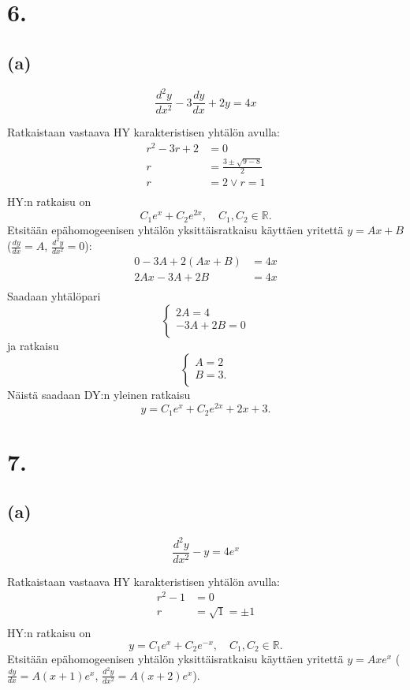 \documentclass{article}
\begin{document}
\section*{6.}

\subsection*{(a)}

\[
  \frac{d^2 y}{d x^2} - 3\frac{dy}{dx} + 2y = 4x
\]

Ratkaistaan vastaava HY karakteristisen yhtälön avulla:
\begin{align*}
  r^2 - 3r + 2 &= 0 \\
  r &= \frac{3 \pm \sqrt{9 - 8}}{2} \\
  r &= 2 \vee r = 1 \\
\end{align*}
HY:n ratkaisu on
\[
  C_1e^x + C_2e^{2x}, \quad C_1,C_2 \in \mathbb{R}.
\]
Etsitään epähomogeenisen yhtälön yksittäisratkaisu käyttäen yritettä
$y = Ax + B$ ($\frac{dy}{dx} = A$, $\frac{d^2 y}{d x^2} = 0$):
\begin{align*}
  0 - 3A + 2(Ax + B) &= 4x \\
  2Ax - 3A + 2B &= 4x \\
\end{align*}
Saadaan yhtälöpari
\[
  \begin{cases}
    2A = 4 \\
    -3A + 2B = 0 \\
  \end{cases}
\]
ja ratkaisu
\[
  \begin{cases}
    A = 2 \\
    B = 3. \\
  \end{cases}
\]
Näistä saadaan DY:n yleinen ratkaisu
\[
  y = C_1e^x + C_2e^{2x} + 2x + 3.
\]

\section*{7.}

\subsection*{(a)}

\[
  \frac{d^2 y}{d x^2} - y = 4e^x
\]

Ratkaistaan vastaava HY karakteristisen yhtälön avulla:
\begin{align*}
  r^2 - 1 &= 0 \\
  r &= \sqrt{1} = \pm 1 \\
\end{align*}
HY:n ratkaisu on
\[
  y = C_1e^x + C_2e^{-x}, \quad C_1,C_2 \in \mathbb{R}.
\]
Etsitään epähomogeenisen yhtälön yksittäisratkaisu käyttäen yritettä
$y = Axe^x$ ($\frac{dy}{dx} = A(x + 1)e^x$, $\frac{d^2 y}{d x^2} = A(x + 2)e^x$).
\end{document}
